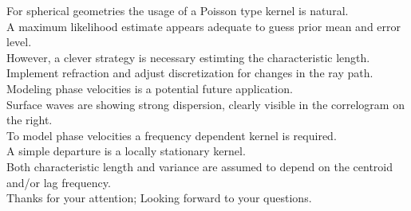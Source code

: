 \documentclass[aspectratio=169, t, 10pt,
    ]{beamer}
\begin{document}
For spherical geometries the usage of a Poisson type kernel is natural.
\\
A maximum likelihood estimate appears adequate to guess prior mean and error level.
\\
However, a clever strategy is necessary estimting the characteristic length.
\\
Implement refraction and
adjust discretization for changes in the ray path.
\\[2mm]

Modeling phase velocities is a potential future application.
\\
Surface waves are showing strong dispersion, clearly visible in the correlogram on the right.
\\
To model phase velocities a frequency dependent kernel is required.
\\
A simple departure is a locally stationary kernel.
\\
Both characteristic length and variance are assumed to depend on the centroid and/or lag frequency.
\\[2mm]

Thanks for your attention; Looking forward to your questions.
\end{document}

